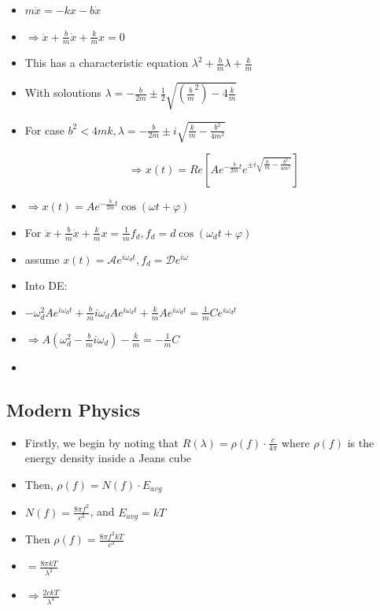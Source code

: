 \documentclass{article}
\begin{document}
\begin{itemize}
    \item \(m\ddot x = -kx - b\dot x\)
    \item \(\Rightarrow \ddot x + \frac{b}{m}\dot x + \frac{k}{m} x = 0\)
    \item This has a characteristic equation \(\lambda^2 + \frac{b}{m}\lambda + \frac{k}{m}\)
    \item With soloutions \(\lambda = - \frac{b}{2m} \pm \frac{1}{2}\sqrt{(\frac{b}{m}^2)-4\frac{k}{m}}\)
    \item For case \(b^2 < 4mk, \lambda = -\frac{b}{2m} \pm i\sqrt{\frac{k}{m} - \frac{b^2}{4m^2}}\)

    \[\Rightarrow x(t) = Re[Ae^{-\frac{b}{2m}t}e^{\pm i\sqrt{\frac{k}{m}-\frac{b^2}{4m^2}}}]\]
    \item \(\Rightarrow\boxed{ x(t) = Ae^{-\frac{b}{2m}t}\cos(\omega t + \varphi)}\)
\end{itemize}


\begin{itemize}
    \item For \(\ddot x + \frac{b}{m}\dot x + \frac{k}{m}x = \frac{1}{m}f_d, f_d = d\cos(\omega_d t+\varphi)\)
    \item assume \({x(t)=\mathcal{A}e^{i\omega_d t}, f_d=\mathcal{D}e^{i\omega}}\) 
    \item Into DE:
    \item \(-\omega_d^2Ae^{i\omega_dt} + \frac{b}{m}i\omega_d Ae^{i\omega_d t} + \frac{k}{m}Ae^{i\omega_d t} = \frac{1}{m}Ce^{i\omega_dt}\)
    \item \(\Rightarrow A(\omega_d^2-\frac{b}{m}i\omega_d)-\frac{k}{m}=-\frac{1}{m}C\)
    \item 
\end{itemize}

\subsection{Modern Physics}


\begin{itemize}
    \item Firstly, we begin by noting that \(R(\lambda)=\rho(f)\cdot\frac{c}{4\pi}\) where \(\rho(f)\) is the energy density inside a Jeans cube
    \item Then, \(\rho(f)=N(f)\cdot E_{avg}\) 
    \item \(N(f)=\frac{8\pi f^2}{c^3}\), and \(E_{avg} = kT\)
    \item Then \(\rho(f)=\frac{8\pi f^2kT}{c^3}\)
    \item \(=\frac{8\pi kT}{\lambda^2}\)
    \item \(\Rightarrow\boxed{\frac{2ckT}{\lambda^4}}\)
\end{itemize}
\end{document}
